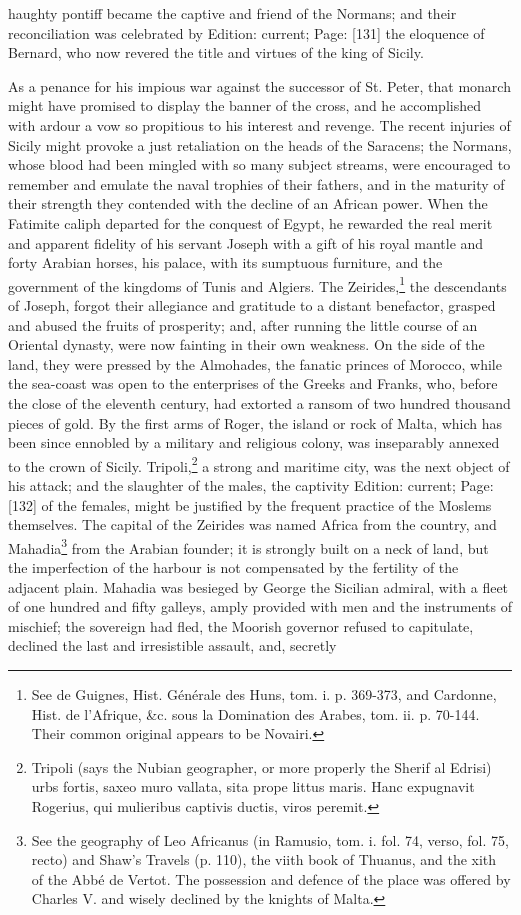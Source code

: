haughty pontiff became the captive and friend of the Normans; and their reconciliation was celebrated by Edition: current; Page: [131] the eloquence of Bernard, who now revered the title and virtues of the king of Sicily.

As a penance for his impious war against the successor of St. Peter, that monarch might have promised to display the banner of the cross, and he accomplished with ardour a vow so propitious to his interest and revenge. The recent injuries of Sicily might provoke a just retaliation on the heads of the Saracens; the Normans, whose blood had been mingled with so many subject streams, were encouraged to remember and emulate the naval trophies of their fathers, and in the maturity of their strength they contended with the decline of an African power. When the Fatimite caliph departed for the conquest of Egypt, he rewarded the real merit and apparent fidelity of his servant Joseph with a gift of his royal mantle and forty Arabian horses, his palace, with its sumptuous furniture, and the government of the kingdoms of Tunis and Algiers. The Zeirides,\footnote{See de Guignes, Hist. Générale des Huns, tom. i. p. 369-373, and Cardonne, Hist. de l\texthebrew{}’Afrique, \&c. sous la Domination des Arabes, tom. ii. p. 70-144. Their common original appears to be Novairi.} the descendants of Joseph, forgot their allegiance and gratitude to a distant benefactor, grasped and abused the fruits of prosperity; and, after running the little course of an Oriental dynasty, were now fainting in their own weakness. On the side of the land, they were pressed by the Almohades, the fanatic princes of Morocco, while the sea-coast was open to the enterprises of the Greeks and Franks, who, before the close of the eleventh century, had extorted a ransom of two hundred thousand pieces of gold. By the first arms of Roger, the island or rock of Malta, which has been since ennobled by a military and religious colony, was inseparably annexed to the crown of Sicily. Tripoli,\footnote{Tripoli (says the Nubian geographer, or more properly the Sherif al Edrisi) urbs fortis, saxeo muro vallata, sita prope littus maris. Hanc expugnavit Rogerius, qui mulieribus captivis ductis, viros peremit.} a strong and maritime city, was the next object of his attack; and the slaughter of the males, the captivity Edition: current; Page: [132] of the females, might be justified by the frequent practice of the Moslems themselves. The capital of the Zeirides was named Africa from the country, and Mahadia\footnote{See the geography of Leo Africanus (in Ramusio, tom. i. fol. 74, verso, fol. 75, recto) and Shaw\texthebrew{}’s Travels (p. 110), the viith book of Thuanus, and the xith of the Abbé de Vertot. The possession and defence of the place was offered by Charles V. and wisely declined by the knights of Malta.} from the Arabian founder; it is strongly built on a neck of land, but the imperfection of the harbour is not compensated by the fertility of the adjacent plain. Mahadia was besieged by George the Sicilian admiral, with a fleet of one hundred and fifty galleys, amply provided with men and the instruments of mischief; the sovereign had fled, the Moorish governor refused to capitulate, declined the last and irresistible assault, and, secretly 